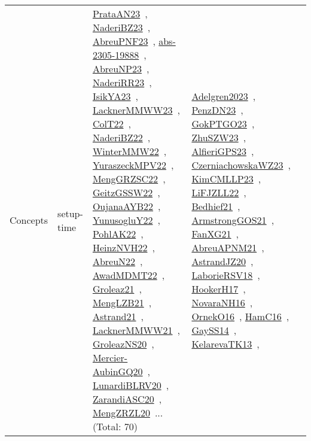 {\begin{longtable}{lp{3cm}>{\raggedright\arraybackslash}p{6cm}>{\raggedright\arraybackslash}p{6cm}>{\raggedright\arraybackslash}p{8cm}}
Concepts & setup-time & \href{../works/PrataAN23.pdf}{PrataAN23}~\cite{PrataAN23}, \href{../works/NaderiBZ23.pdf}{NaderiBZ23}~\cite{NaderiBZ23}, \href{../works/AbreuPNF23.pdf}{AbreuPNF23}~\cite{AbreuPNF23}, \href{../works/abs-2305-19888.pdf}{abs-2305-19888}~\cite{abs-2305-19888}, \href{../works/AbreuNP23.pdf}{AbreuNP23}~\cite{AbreuNP23}, \href{../works/NaderiRR23.pdf}{NaderiRR23}~\cite{NaderiRR23}, \href{../works/IsikYA23.pdf}{IsikYA23}~\cite{IsikYA23}, \href{../works/LacknerMMWW23.pdf}{LacknerMMWW23}~\cite{LacknerMMWW23}, \href{../works/ColT22.pdf}{ColT22}~\cite{ColT22}, \href{../works/NaderiBZ22.pdf}{NaderiBZ22}~\cite{NaderiBZ22}, \href{../works/WinterMMW22.pdf}{WinterMMW22}~\cite{WinterMMW22}, \href{../works/YuraszeckMPV22.pdf}{YuraszeckMPV22}~\cite{YuraszeckMPV22}, \href{../works/MengGRZSC22.pdf}{MengGRZSC22}~\cite{MengGRZSC22}, \href{../works/GeitzGSSW22.pdf}{GeitzGSSW22}~\cite{GeitzGSSW22}, \href{../works/OujanaAYB22.pdf}{OujanaAYB22}~\cite{OujanaAYB22}, \href{../works/YunusogluY22.pdf}{YunusogluY22}~\cite{YunusogluY22}, \href{../works/PohlAK22.pdf}{PohlAK22}~\cite{PohlAK22}, \href{../works/HeinzNVH22.pdf}{HeinzNVH22}~\cite{HeinzNVH22}, \href{../works/AbreuN22.pdf}{AbreuN22}~\cite{AbreuN22}, \href{../works/AwadMDMT22.pdf}{AwadMDMT22}~\cite{AwadMDMT22}, \href{../works/Groleaz21.pdf}{Groleaz21}~\cite{Groleaz21}, \href{../works/MengLZB21.pdf}{MengLZB21}~\cite{MengLZB21}, \href{../works/Astrand21.pdf}{Astrand21}~\cite{Astrand21}, \href{../works/LacknerMMWW21.pdf}{LacknerMMWW21}~\cite{LacknerMMWW21}, \href{../works/GroleazNS20.pdf}{GroleazNS20}~\cite{GroleazNS20}, \href{../works/Mercier-AubinGQ20.pdf}{Mercier-AubinGQ20}~\cite{Mercier-AubinGQ20}, \href{../works/LunardiBLRV20.pdf}{LunardiBLRV20}~\cite{LunardiBLRV20}, \href{../works/ZarandiASC20.pdf}{ZarandiASC20}~\cite{ZarandiASC20}, \href{../works/MengZRZL20.pdf}{MengZRZL20}~\cite{MengZRZL20}... (Total: 70) & \href{../works/Adelgren2023.pdf}{Adelgren2023}~\cite{Adelgren2023}, \href{../works/PenzDN23.pdf}{PenzDN23}~\cite{PenzDN23}, \href{../works/GokPTGO23.pdf}{GokPTGO23}~\cite{GokPTGO23}, \href{../works/ZhuSZW23.pdf}{ZhuSZW23}~\cite{ZhuSZW23}, \href{../works/AlfieriGPS23.pdf}{AlfieriGPS23}~\cite{AlfieriGPS23}, \href{../works/CzerniachowskaWZ23.pdf}{CzerniachowskaWZ23}~\cite{CzerniachowskaWZ23}, \href{../works/KimCMLLP23.pdf}{KimCMLLP23}~\cite{KimCMLLP23}, \href{../works/LiFJZLL22.pdf}{LiFJZLL22}~\cite{LiFJZLL22}, \href{../works/Bedhief21.pdf}{Bedhief21}~\cite{Bedhief21}, \href{../works/ArmstrongGOS21.pdf}{ArmstrongGOS21}~\cite{ArmstrongGOS21}, \href{../works/FanXG21.pdf}{FanXG21}~\cite{FanXG21}, \href{../works/AbreuAPNM21.pdf}{AbreuAPNM21}~\cite{AbreuAPNM21}, \href{../works/AstrandJZ20.pdf}{AstrandJZ20}~\cite{AstrandJZ20}, \href{../works/LaborieRSV18.pdf}{LaborieRSV18}~\cite{LaborieRSV18}, \href{../works/HookerH17.pdf}{HookerH17}~\cite{HookerH17}, \href{../works/NovaraNH16.pdf}{NovaraNH16}~\cite{NovaraNH16}, \href{../works/OrnekO16.pdf}{OrnekO16}~\cite{OrnekO16}, \href{../works/HamC16.pdf}{HamC16}~\cite{HamC16}, \href{../works/GaySS14.pdf}{GaySS14}~\cite{GaySS14}, \href{../works/KelarevaTK13.pdf}{KelarevaTK13}~\cite{KelarevaTK13}, 
\end{longtable}}
